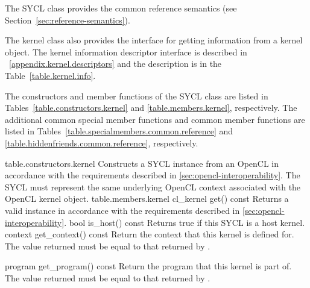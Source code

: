 The SYCL  class provides the common reference semantics
(see Section~\ref{sec:reference-semantics}).

The kernel class also provides the interface for getting information from a
kernel object. The kernel information descriptor interface is described in%
~\ref{appendix.kernel.descriptors} and the description is in the
Table~\ref{table.kernel.info}.

The constructors and member functions of the SYCL  class are listed in Tables~\ref{table.constructors.kernel} and \ref{table.members.kernel}, respectively. The additional common special member functions and common member functions are listed in Tables~\ref{table.specialmembers.common.reference} and \ref{table.hiddenfriends.common.reference}, respectively.


{table.constructors.kernel}
  {
    Constructs a SYCL  instance from an OpenCL  in accordance with the requirements described in \ref{sec:opencl-interoperability}.
    The SYCL  must represent the same underlying OpenCL context associated with the OpenCL kernel object.
  }
\completeTable
{table.members.kernel}
  \addRow
    {cl_kernel get() const}
    {   
      Returns a valid  instance in accordance with the requirements described in \ref{sec:opencl-interoperability}.
     }
  \addRow
  {bool is_host() const}
  {
    Returns true if this SYCL  is a host kernel.
  }
  \addRow
    {context get_context() const}
    {
        Return the context that this kernel is defined for.
        The value returned must be equal to that returned by .
    }

  \addRow
    {program get_program() const}
    {
        Return the program that this kernel is part of.
        The value returned must be equal to that returned by .
    }

